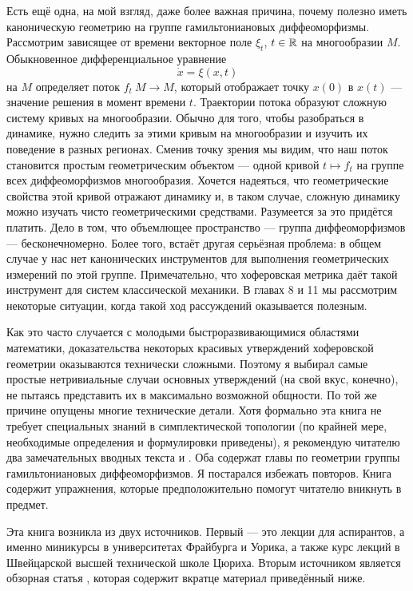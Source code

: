 Есть ещё одна, на мой взгляд, даже более важная причина, почему полезно иметь каноническую геометрию на группе гамильтониановых диффеоморфизмы.
Рассмотрим зависящее от времени векторное поле $\xi_t$, $t\in \mathbb{R}$ на многообразии $M$.
Обыкновенное дифференциальное уравнение
\[\dot x=\xi(x,t)\]
на $M$ определяет поток $f_t\: M \to M$, который отображает точку $x(0)$ в $x(t)$ --- значение решения в момент времени $t$.
Траектории потока образуют сложную систему кривых на многообразии.
Обычно для того, чтобы разобраться в динамике, нужно следить за этими кривым на многообразии и изучить их поведение в разных регионах.
Сменив точку зрения мы видим, что наш поток становится простым
геометрическим объектом --- одной кривой $t \mapsto f_t$ на группе всех диффеоморфизмов многообразия.
Хочется надеяться, что геометрические свойства этой кривой отражают динамику и, в таком случае, сложную динамику можно изучать чисто геометрическими средствами.
Разумеется за это придётся платить.
Дело в том, что объемлющее пространство --- группа
диффеоморфизмов --- бесконечномерно.
Более того, встаёт другая серьёзная проблема:
в общем случае у нас нет канонических инструментов для выполнения геометрических измерений по этой группе.
Примечательно, что хоферовская метрика даёт такой инструмент для систем классической механики.
В главах 8 и 11 мы рассмотрим некоторые ситуации,
когда такой ход рассуждений оказывается полезным.

Как это часто случается с молодыми быстроразвивающимися областями математики, доказательства некоторых красивых утверждений хоферовской геометрии оказываются технически сложными.
Поэтому я выбирал самые простые нетривиальные случаи основных утверждений (на свой вкус, конечно), не пытаясь представить их в максимально возможной общности.
По той же причине опущены многие технические детали.
Хотя формально эта книга не требует специальных знаний в симплектической топологии (по крайней мере, необходимые определения и формулировки приведены), я рекомендую читателю  два замечательных вводных текста \cite{HZ} и \cite{MS}.
Оба содержат главы по геометрии группы гамильтониановых диффеоморфизмов.
Я постарался избежать повторов.
Книга содержит упражнения, которые предположительно помогут читателю вникнуть в предмет.

Эта книга возникла из двух источников.
Первый --- это лекции для аспирантов, а именно миникурсы в университетах Фрайбурга и Уорика, а также курс лекций в Швейцарской высшей технической школе Цюриха.
Вторым источником является обзорная статья \cite{P8}, которая содержит
вкратце материал приведённый ниже.

